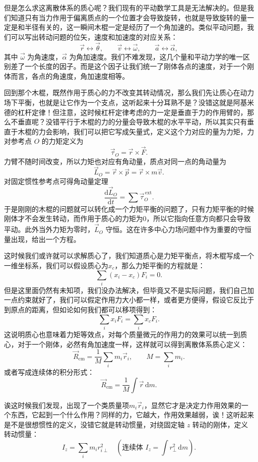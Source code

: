 \documentclass[UTF8]{ctexbook}
\begin{document}
但是怎么求这离散体系的质心呢？我们现有的平动数学工具是无法解决的。但是我们知道只有当力作用于偏离质点的一个位置才会导致旋转，也就是导致旋转的量一定是和半径有关的，这一瞬间木棍一定是经历了一个角加速的。类似平动问题，我们可以写出转动问题的位矢，速度和加速度的对应关系：
\[
\vec{r}\leftrightarrow \vec{\theta},\qquad
\vec{v}\leftrightarrow \vec{\omega},\qquad
\vec{a}\leftrightarrow \vec{\alpha},
\]
其中 \(\vec{\omega}\) 为角速度，\(\vec{\alpha}\) 为角加速度。我们不难发现，这几个量和平动力学的唯一区别差了一个长度的因子。而是这个因子让我们统一了刚体各点的速度，对于一个刚体而言，各点的角速度，角加速度相等。

回到那个木棍，既然作用于质心的力不改变其转动情况，那么我们先让质心在动力场下平衡，也就是让它作为一个支点，这听起来十分耳熟不是？没错这就是阿基米德的杠杆定律！但注意，这时候杠杆定律考虑的力一定是垂直于力的作用臂的，那么不垂直呢？没错平行于木棍的力的分量会导致木棍的水平平动，所以其实只有垂直于木棍的力会影响，我们可以把它写成矢量式，定义这个力对应的量为力矩，力对参考点 \(O\) 的力矩定义为
\[
\vec{\tau}_O=\vec{r}\times \vec{F}.
\]
力臂不随时间改变，所以力矩也对应有角动量，质点对同一点的角动量为
\[
\vec{L}_O=\vec{r}\times \vec{p}=\vec{r}\times m\vec{v}.
\]
对固定惯性参考点可得角动量定理
\[
\frac{\mathrm d\vec{L}_O}{\mathrm dt}=\sum \vec{\tau}_O^{\,\text{ext}}.
\]
于是刚刚的木棍的问题就可以转化成一个力矩平衡的问题了，只有力矩平衡的时候刚体才不会发生转动，而作用于质心的力矩为0，所以它指向任意方向都只会导致平动。此外当外力矩为零时，\(\vec{L}_O\) 守恒。这在许多中心力场问题中作为重要的守恒量出现，给出一个方程。

这时候我们或许就可以求解质心了，我们知道质心是力矩平衡点，将木棍写成一个一维坐标系，我们可以假设质心为$x_c$，那么力矩平衡的方程就是：
\[
 \sum_i (x_i-x_c) F_i=0.
\]
但是这里面仍然有未知项，我们没办法解决，但毕竟又不是实际问题，我们自己加一点约束就好了，我们可以假定作用力大小都一样，或者更方便得，假设它反比于到原点的距离，但如论如何我们都可以移项得到：
\[
 \sum_i x_i F_i=\sum_i x_c F_i.
\]
这说明质心也意味着力矩等效点，对每个质量微元的作用力的效果可以统一到质心，对于一个刚体，必然有角加速度一样，这样就可以得到离散体系质心定义：
\[
\vec{R}_{\mathrm{cm}}=\frac1M\sum_i m_i\vec{r}_i,
\qquad M=\sum_i m_i.
\]
或者写成连续体的积分形式：
\[
\vec{R}_{\mathrm{cm}}=\frac1M\int \vec{r}\,\mathrm dm.
\]

诶这时候我们发现，出现了一个类质量项$m_i\vec{r}_i$，显然它才是决定力作用效果的一个东西，它起到一个什么作用？同样的力，它越大，作用效果越弱，诶！这听起来是不是很想惯性的定义，没错它就是转动惯量，对绕固定轴 \(z\) 转动的刚体，定义转动惯量：
\[
I_z=\sum_i m_i r_{i\perp}^2\quad (\text{连续体 }I_z=\int r_\perp^2\,\mathrm dm).
\]
\end{document}
